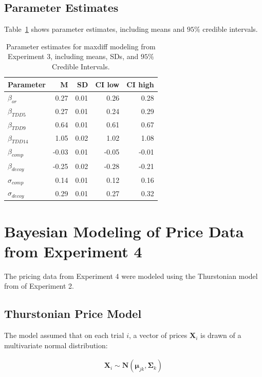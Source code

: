 \section{Parameter Estimates}
Table~\ref{tab:maxdiff_params} shows parameter estimates, including means and $95\%$ credible intervals. 
\begin{table}[ht]
    \centering
    \begin{tabular}{lrrrr}
        \toprule
        Parameter & M & SD & CI low & CI high \\
        \midrule
        $\beta_{or}$ & 0.27 & 0.01 & 0.26 & 0.28\\
        $\beta_{TDD5}$ & 0.27 & 0.01 & 0.24 & 0.29\\
        $\beta_{TDD9}$ & 0.64 & 0.01 & 0.61 & 0.67\\
        $\beta_{TDD14}$ & 1.05 & 0.02 & 1.02 & 1.08\\
        $\beta_{comp}$ & -0.03 & 0.01 & -0.05 & -0.01\\
        $\beta_{decoy}$ & -0.25 & 0.02 & -0.28 & -0.21\\
        $\sigma_{comp}$ & 0.14 & 0.01 & 0.12 & 0.16 \\
        $\sigma_{decoy}$ & 0.29 & 0.01 & 0.27 & 0.32 \\
        \bottomrule 
    \end{tabular}
    \caption{Parameter estimates for maxdiff modeling from Experiment 3, including means, SDs, and $95\%$ Credible Intervals.}
    \label{tab:maxdiff_params}
 \end{table}

\chapter{Bayesian Modeling of Price Data from Experiment 4}

The pricing data from Experiment 4 were modeled using the Thurstonian model from of Experiment 2.

\section{Thurstonian Price Model}

The model assumed that on each trial $i$, a vector of prices $\textbf{X}_{i}$ is drawn of a multivariate normal distribution:

\begin{align}
    \textbf{X}_{i}\sim \mathcal{\textbf{N}}(\boldsymbol{\mu}_{jk},\boldsymbol{\Sigma}_{k})
\end{align}

